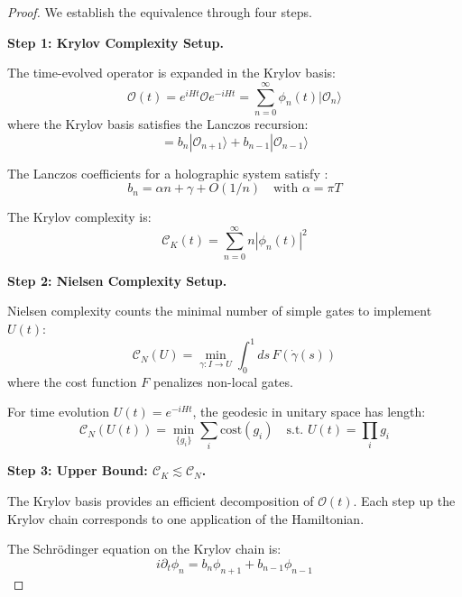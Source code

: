 \documentclass[12pt,a4paper]{article}
\begin{document}
\begin{proof}
We establish the equivalence through four steps.

\textbf{Step 1: Krylov Complexity Setup.}

The time-evolved operator is expanded in the Krylov basis:
\begin{equation}
\mathcal{O}(t) = e^{iHt} \mathcal{O} e^{-iHt} = \sum_{n=0}^\infty \phi_n(t) |\mathcal{O}_n\rangle
\end{equation}
where the Krylov basis satisfies the Lanczos recursion:
\begin{equation}
[H, |\mathcal{O}_n\rangle] = b_n |\mathcal{O}_{n+1}\rangle + b_{n-1} |\mathcal{O}_{n-1}\rangle
\end{equation}

The Lanczos coefficients for a holographic system satisfy \cite{parker2019}:
\begin{equation}
b_n = \alpha n + \gamma + O(1/n) \quad \text{with } \alpha = \pi T
\end{equation}

The Krylov complexity is:
\begin{equation}
\mathcal{C}_K(t) = \sum_{n=0}^\infty n |\phi_n(t)|^2
\end{equation}

\textbf{Step 2: Nielsen Complexity Setup.}

Nielsen complexity counts the minimal number of simple gates to implement $U(t)$:
\begin{equation}
\mathcal{C}_N(U) = \min_{\gamma: I \to U} \int_0^1 ds \, F(\dot{\gamma}(s))
\end{equation}
where the cost function $F$ penalizes non-local gates.

For time evolution $U(t) = e^{-iHt}$, the geodesic in unitary space has length:
\begin{equation}
\mathcal{C}_N(U(t)) = \min_{\{g_i\}} \sum_i \text{cost}(g_i) \quad \text{s.t. } U(t) = \prod_i g_i
\end{equation}

\textbf{Step 3: Upper Bound: $\mathcal{C}_K \lesssim \mathcal{C}_N$.}

The Krylov basis provides an efficient decomposition of $\mathcal{O}(t)$. Each step up the Krylov chain corresponds to one application of the Hamiltonian.

The Schrödinger equation on the Krylov chain is:
\begin{equation}
i\partial_t \phi_n = b_n \phi_{n+1} + b_{n-1} \phi_{n-1}
\end{equation}


\end{proof}
\end{document}
